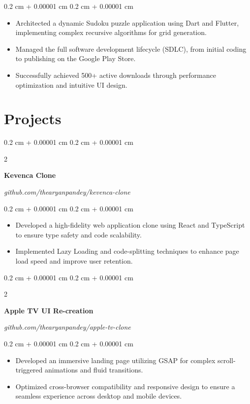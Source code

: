 \documentclass[10pt, a4paper]{article}
\newenvironment{highlights}{
    \begin{itemize}[
        topsep=0.10 cm,
        parsep=0.10 cm,
        partopsep=0pt,
        itemsep=0pt,
        leftmargin=0.4 cm + 10pt
    ]
}{
    \end{itemize}
} %
\newenvironment{onecolentry}{
    \begin{adjustwidth}{
        0.2 cm + 0.00001 cm
    }{
        0.2 cm + 0.00001 cm
    }
}{
    \end{adjustwidth}
} %
\newenvironment{twocolentry}[2][]{
    \onecolentry
    \def\secondColumn{#2}
    \setcolumnwidth{\fill, 4.5 cm}
    \begin{paracol}{2}
}{
    \switchcolumn \raggedleft \secondColumn
    \end{paracol}
    \endonecolentry
} %
\begin{document}
        \vspace{0.10 cm}
        \begin{onecolentry}
        \begin{highlights}
            \item Architected a dynamic Sudoku puzzle application using Dart and Flutter, implementing complex recursive algorithms for grid generation.
\item Managed the full software development lifecycle (SDLC), from initial coding to publishing on the Google Play Store.
\item Successfully achieved 500+ active downloads through performance optimization and intuitive UI design.
        \end{highlights}
        \end{onecolentry}
        \vspace{0.2 cm}
        

    \section{Projects}
\begin{twocolentry}{
        \textit{github.com/thearyanpandey/kevenca-clone}
    }
    \textbf{Kevenca Clone}
    \end{twocolentry}

    \vspace{0.10 cm}
    \begin{onecolentry}
    \begin{highlights}
        \item Developed a high-fidelity web application clone using React and TypeScript to ensure type safety and code scalability.
\item Implemented Lazy Loading and code-splitting techniques to enhance page load speed and improve user retention.
    \end{highlights}
    \end{onecolentry}
    \vspace{0.2 cm}
\begin{twocolentry}{
        \textit{github.com/thearyanpandey/apple-tv-clone}
    }
    \textbf{Apple TV UI Re-creation}
    \end{twocolentry}

    \vspace{0.10 cm}
    \begin{onecolentry}
    \begin{highlights}
        \item Developed an immersive landing page utilizing GSAP for complex scroll-triggered animations and fluid transitions.
\item Optimized cross-browser compatibility and responsive design to ensure a seamless experience across desktop and mobile devices.
    \end{highlights}
    \end{onecolentry}
    \vspace{0.2 cm}
\end{document}
